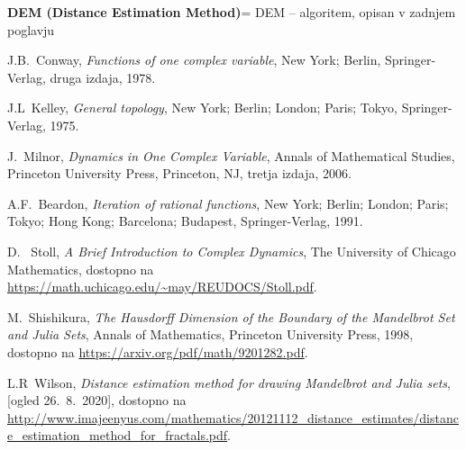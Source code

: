 \documentclass[12pt,a4paper]{amsart}
\theoremstyle{definition} %
\theoremstyle{plain} %
\newcommand{\geslo}[2]{\noindent\textbf{#1}\hspace*{3mm}\hangindent=\parindent\hangafter=1 #2}
\begin{document}
\geslo{DEM (Distance Estimation Method)} {DEM -- algoritem, opisan v zadnjem poglavju}

\clearpage

\begin{thebibliography}{0}

J.B.~Conway, \emph{Functions of one complex variable}, New York; Berlin, Springer-Verlag, druga izdaja, 1978.

J.L~Kelley, \emph{General topology}, New York; Berlin; London; Paris; Tokyo, Springer-Verlag, 1975.

J.~Milnor, \emph{Dynamics in One Complex Variable}, Annals of Mathematical Studies, Princeton University Press, Princeton, NJ, tretja izdaja, 2006.

A.F.~Beardon, \emph{Iteration of rational functions}, New York; Berlin; London; Paris; Tokyo; Hong Kong; Barcelona; Budapest, Springer-Verlag, 1991.

D. ~Stoll, \emph{A Brief Introduction to Complex Dynamics}, The University of Chicago Mathematics,
dostopno na \url{https://math.uchicago.edu/~may/REUDOCS/Stoll.pdf}.

M.~Shishikura, \emph{The Hausdorff Dimension of the Boundary of the Mandelbrot Set and Julia Sets}, Annals of Mathematics, Princeton University Press, 1998,
dostopno na \url{https://arxiv.org/pdf/math/9201282.pdf}.

L.R~Wilson, \emph{Distance estimation method for drawing Mandelbrot and Julia sets}, [ogled 26.~8.~2020], dostopno na \url{http://www.imajeenyus.com/mathematics/20121112_distance_estimates/distance_estimation_method_for_fractals.pdf}.

\end{thebibliography}
\end{document}
